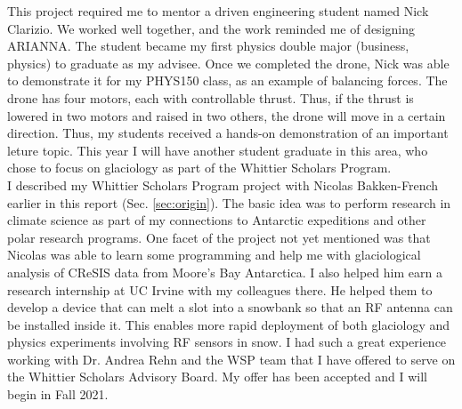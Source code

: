 \documentclass[../../../main.tex]{subfiles}
\begin{document}
This project required me to mentor a driven engineering student named Nick Clarizio.  We worked well together, and the work reminded me of designing ARIANNA.  The student became my first physics double major (business, physics) to graduate as my advisee.  Once we completed the drone, Nick was able to demonstrate it for my PHYS150 class, as an example of balancing forces.  The drone has four motors, each with controllable thrust.  Thus, if the thrust is lowered in two motors and raised in two others, the drone will move in a certain direction.  Thus, my students received a hands-on demonstration of an important leture topic.  This year I will have another student graduate in this area, who chose to focus on glaciology as part of the Whittier Scholars Program.
\\
\vspace{0.25cm}
I described my Whittier Scholars Program project with Nicolas Bakken-French earlier in this report (Sec. \ref{sec:origin}).  The basic idea was to perform research in climate science as part of my connections to Antarctic expeditions and other polar research programs.  One facet of the project not yet mentioned was that Nicolas was able to learn some programming and help me with glaciological analysis of CReSIS data from Moore's Bay Antarctica.  I also helped him earn a research internship at UC Irvine with my colleagues there.  He helped them to develop a device that can melt a slot into a snowbank so that an RF antenna can be installed inside it.  This enables more rapid deployment of both glaciology and physics experiments involving RF sensors in snow.  I had such a great experience working with Dr. Andrea Rehn and the WSP team that I have offered to serve on the Whittier Scholars Advisory Board.  My offer has been accepted and I will begin in Fall 2021.
\end{document}
